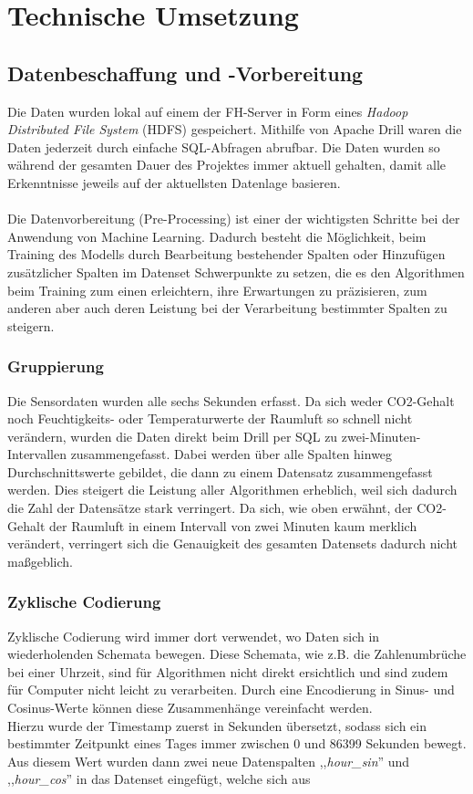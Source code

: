 \newpage
\chapter{Technische Umsetzung}

\section{Datenbeschaffung und -Vorbereitung}
Die Daten wurden lokal auf einem der FH-Server in Form eines \textit{Hadoop Distributed File System} (HDFS) 
gespeichert. Mithilfe von Apache Drill waren die Daten jederzeit durch einfache SQL-Abfragen abrufbar. 
Die Daten wurden so während der gesamten Dauer des Projektes immer aktuell gehalten, damit alle Erkenntnisse 
jeweils auf der aktuellsten Datenlage basieren.
\\\\
Die Datenvorbereitung (Pre-Processing) ist einer der wichtigsten Schritte bei der Anwendung von Machine 
Learning. Dadurch besteht die Möglichkeit, beim Training des Modells durch Bearbeitung bestehender Spalten
oder Hinzufügen zusätzlicher Spalten im Datenset Schwerpunkte zu setzen, die es den Algorithmen beim Training
zum einen erleichtern, ihre Erwartungen zu präzisieren, zum anderen aber auch deren Leistung bei der Verarbeitung
bestimmter Spalten zu steigern.
\subsection{Gruppierung}
Die Sensordaten wurden alle sechs Sekunden erfasst. Da sich weder CO2-Gehalt noch Feuchtigkeits- oder 
Temperaturwerte der Raumluft so schnell nicht verändern, wurden die Daten direkt beim Drill per SQL zu 
zwei-Minuten-Intervallen zusammengefasst. Dabei werden über alle Spalten hinweg Durchschnittswerte gebildet, 
die dann zu einem Datensatz zusammengefasst werden. 
Dies steigert die Leistung aller Algorithmen erheblich, weil sich dadurch die Zahl der 
Datensätze stark verringert. Da sich, wie oben erwähnt, der CO2-Gehalt der Raumluft in einem 
Intervall von zwei Minuten kaum merklich verändert, verringert sich die Genauigkeit des gesamten Datensets
dadurch nicht maßgeblich.
\subsection{Zyklische Codierung}
Zyklische Codierung wird immer dort verwendet, wo Daten sich in wiederholenden Schemata bewegen. Diese 
Schemata, wie z.B. die Zahlenumbrüche bei einer Uhrzeit, sind für Algorithmen nicht direkt ersichtlich und 
sind zudem für Computer nicht leicht zu verarbeiten. Durch eine Encodierung in 
Sinus- und Cosinus-Werte können diese Zusammenhänge vereinfacht werden.\\
Hierzu wurde der Timestamp zuerst in Sekunden übersetzt, sodass sich ein bestimmter Zeitpunkt eines Tages 
immer zwischen 0 und 86399 Sekunden bewegt.
Aus diesem Wert wurden dann zwei neue Datenspalten ,,\textit{hour\_sin}'' und ,,\textit{hour\_cos}'' 
in das Datenset eingefügt, welche sich aus 

